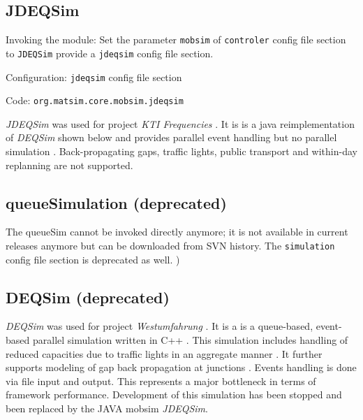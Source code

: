 \subsection{JDEQSim}
\label{sec:jdeqsim}
\begin{compactitem}
\item Invoking the module: Set the parameter \lstinline|mobsim| of \lstinline|controler| config file section to \lstinline|JDEQSim| provide a \lstinline|jdeqsim| config file section.
\item Configuration: \lstinline|jdeqsim| config file section
\item Code: \lstinline|org.matsim.core.mobsim.jdeqsim|
\end{compactitem}

\emph{JDEQSim} \citep[][]{WaraichEtAl_TechRep_IVT_2009, WaraichEtAl_STRC_2009} was used for project \emph{KTI Frequencies} \citep[][]{BalmerEtAl_ResRep_datapuls_2010}. It is is a java reimplementation of \emph{DEQSim} shown below \citep[][]{WaraichEtAl_STRC_2009, CharyparEtAl_TRR_2007, CharyparEtAl_TRB_2009} and provides parallel event handling but no parallel simulation \citep[][p.11]{BalmerEtAl_ResRep_datapuls_2010}. Back-propagating gaps, traffic lights, public transport and within-day replanning are not supported.

\subsection{queueSimulation (deprecated)}
\label{sec:queueSimulation}
The queueSim cannot be invoked directly anymore; it is not available in current releases anymore but can be downloaded from SVN history. The \lstinline|simulation| config file section is deprecated as well. )

\subsection{DEQSim (deprecated)}
\label{sec:deqsim}
\emph{DEQSim} was used for project \emph{Westumfahrung} \citep[][]{BalmerEtAl_ResRep_bdktzrh_2009}. It is a is a queue-based, event-based parallel simulation written in C++ \citep[][]{CharyparEtAl_TRR_2007, Charypar_PhDThesis_2008}. This simulation includes handling of reduced capacities due to traffic lights in an aggregate manner \citep[][p.139 ff]{Charypar_PhDThesis_2008}. It further supports modeling of gap back propagation at junctions \citep[][p.98 ff]{Charypar_PhDThesis_2008}. Events handling is done via file input and output. This represents a major bottleneck in terms of framework performance. Development of this simulation has been stopped and been replaced by the JAVA mobsim \emph{JDEQSim}.

